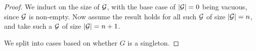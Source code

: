 \begin{proof}
\leanok
{}
We induct on the size of $\mathcal{G}$, with the base case of $|\mathcal{G}| = 0$ being vacuous, since $\mathcal{G}$ is non-empty. Now assume the result holds for all such $\mathcal{G}$ of size $|\mathcal{G}| = n$, and take such a $\mathcal{G}$ of size $|\mathcal{G}| = n+1$. 

\vs

We split into cases based on whether $G$ is a singleton.
\end{proof}





    
